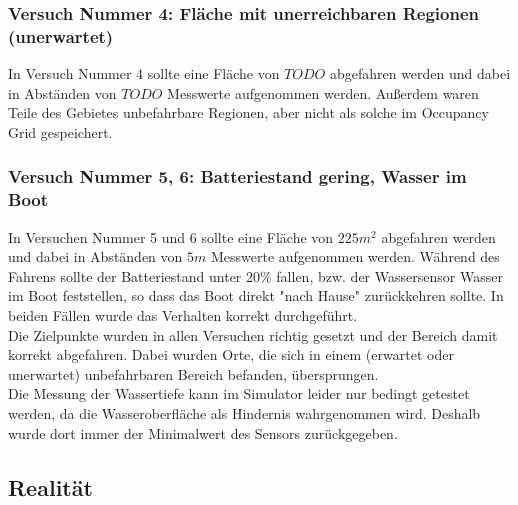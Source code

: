 \documentclass[11pt]{article}
\begin{document}
\subsubsection{Versuch Nummer 4: Fläche mit unerreichbaren Regionen (unerwartet)}
In Versuch Nummer 4 sollte eine Fläche von $TODO$ abgefahren werden und dabei in Abständen von $TODO$ Messwerte aufgenommen werden. Außerdem waren Teile des Gebietes unbefahrbare Regionen, aber nicht als solche im Occupancy Grid gespeichert.

\subsubsection{Versuch Nummer 5, 6: Batteriestand gering, Wasser im Boot}
In Versuchen Nummer 5 und 6 sollte eine Fläche von $225m^2$ abgefahren werden und dabei in Abständen von $5m$ Messwerte aufgenommen werden. Während des Fahrens sollte der Batteriestand unter 20\% fallen, bzw. der Wassersensor Wasser im Boot feststellen, so dass das Boot direkt "nach Hause" zurückkehren sollte. In beiden Fällen wurde das Verhalten korrekt durchgeführt.\\

Die Zielpunkte wurden in allen Versuchen richtig gesetzt und der Bereich damit korrekt abgefahren. Dabei wurden Orte, die sich in einem (erwartet oder unerwartet) unbefahrbaren Bereich befanden, übersprungen.\\
Die Messung der Wassertiefe kann im Simulator leider nur bedingt getestet werden, da die Wasseroberfläche als Hindernis wahrgenommen wird. Deshalb wurde dort immer der Minimalwert des Sensors zurückgegeben.

\subsection{Realität}
\end{document}
